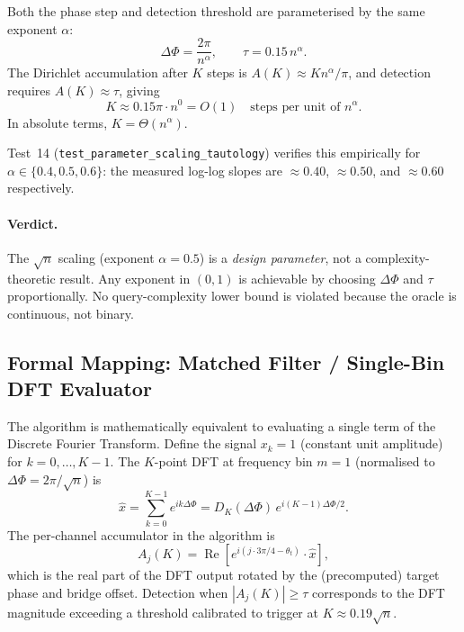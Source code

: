 \documentclass[12pt,a4paper]{article}
\theoremstyle{plain}
\theoremstyle{definition}
\theoremstyle{remark}
\begin{document}
Both the phase step and detection threshold are parameterised by the same
exponent $\alpha$:
\begin{equation}
  \Delta\Phi = \frac{2\pi}{n^\alpha}, \qquad
  \tau = 0.15\,n^\alpha.
  \label{eq:alpha-params}
\end{equation}
The Dirichlet accumulation after $K$ steps is
$A(K) \approx K n^\alpha / \pi$, and detection requires
$A(K) \approx \tau$, giving
\begin{equation}
  K \approx 0.15\pi \cdot n^0 = O(1)
  \quad\text{steps per unit of } n^\alpha.
\end{equation}
In absolute terms, $K = \Theta(n^\alpha)$.

Test~14 (\texttt{test\_parameter\_scaling\_tautology}) verifies this
empirically for $\alpha \in \{0.4, 0.5, 0.6\}$: the measured log-log slopes
are $\approx 0.40$, $\approx 0.50$, and $\approx 0.60$ respectively.

\paragraph{Verdict.}
The $\sqrt{n}$ scaling (exponent $\alpha = 0.5$) is a \emph{design parameter},
not a complexity-theoretic result.  Any exponent in $(0,1)$ is achievable by
choosing $\Delta\Phi$ and $\tau$ proportionally.  No query-complexity lower
bound is violated because the oracle is continuous, not binary.

\subsection{Formal Mapping: Matched Filter / Single-Bin DFT Evaluator}
\label{sec:formal-mapping}

The algorithm is mathematically equivalent to evaluating a single term of
the Discrete Fourier Transform.  Define the signal
$x_k = 1$ (constant unit amplitude) for $k = 0,\ldots,K-1$.  The $K$-point
DFT at frequency bin $m = 1$ (normalised to $\Delta\Phi = 2\pi/\sqrt{n}$) is
\begin{equation}
  \hat{x} = \sum_{k=0}^{K-1} e^{i k \Delta\Phi}
           = D_K(\Delta\Phi)\, e^{i(K-1)\Delta\Phi/2}.
\end{equation}
The per-channel accumulator in the algorithm is
\begin{equation}
  A_j(K) = \operatorname{Re}\!\left[
    e^{i(j\cdot 3\pi/4 - \theta_t)} \cdot \hat{x}
  \right],
\end{equation}
which is the real part of the DFT output rotated by the (precomputed)
target phase and bridge offset.  Detection when $|A_j(K)| \ge \tau$
corresponds to the DFT magnitude exceeding a threshold calibrated to
trigger at $K \approx 0.19\sqrt{n}$.
\end{document}
